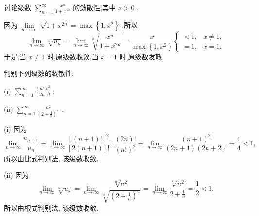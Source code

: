 \begin{example}

\end{example}
讨论级数 \(\mathop{\sum }\limits_{{n = 1}}^{\infty }\frac{{x}^{n}}{1 + {x}^{2n}}\) 的敛散性,其中 \(x > 0\) .

\begin{solution}

\end{solution}
因为 \(\mathop{\lim }\limits_{{n \rightarrow  \infty }}\sqrt[n]{1 + {x}^{2n}} = \max \left\{  {1,{x}^{2}}\right\}\) ,所以
\[
\mathop{\lim }\limits_{{n \rightarrow  \infty }}\sqrt[n]{{u}_{n}} = \mathop{\lim }\limits_{{n \rightarrow  \infty }}\sqrt[n]{\frac{{x}^{n}}{1 + {x}^{2n}}} = \frac{x}{\max \left\{  {1,{x}^{2}}\right\}  }\left\{  \begin{array}{ll}  < 1, & x \neq  1, \\   = 1, & x = 1. \end{array}\right.
\]
于是,当 \(x \neq  1\) 时,原级数收敛,当 \(x = 1\) 时,原级数发散.

\begin{example}

\end{example}
判别下列级数的敛散性:

 (i) \(\mathop{\sum }\limits_{{n = 1}}^{\infty }\frac{{\left( n!\right) }^{2}}{\left( {2n}\right) !}\) ;

(ii) \(\mathop{\sum }\limits_{{n = 1}}^{\infty }\frac{{n}^{2}}{{\left( 2 + \frac{1}{n}\right) }^{n}}\) .

\begin{solution}

\end{solution}
(i) 因为
\[
\mathop{\lim }\limits_{{n \rightarrow  \infty }}\frac{{u}_{n + 1}}{{u}_{n}} = \mathop{\lim }\limits_{{n \rightarrow  \infty }}\frac{{\left\lbrack  \left( n + 1\right) !\right\rbrack  }^{2}}{\left\lbrack  {2\left( {n + 1}\right) }\right\rbrack  !} \cdot  \frac{\left( {2n}\right) !}{{\left( n!\right) }^{2}} = \mathop{\lim }\limits_{{n \rightarrow  \infty }}\frac{{\left( n + 1\right) }^{2}}{\left( {{2n} + 1}\right) \left( {{2n} + 2}\right) } = \frac{1}{4} < 1,
\]
所以由比式判别法, 该级数收敛.

(ii) 因为
\[
\mathop{\lim }\limits_{{n \rightarrow  \infty }}\sqrt[n]{{u}_{n}} = \mathop{\lim }\limits_{{n \rightarrow  \infty }}\frac{\sqrt[n]{{n}^{2}}}{\sqrt[n]{{\left( 2 + \frac{1}{n}\right) }^{n}}} = \mathop{\lim }\limits_{{n \rightarrow  \infty }}\frac{\sqrt[n]{{n}^{2}}}{2 + \frac{1}{n}} = \frac{1}{2} < 1,
\]
所以由根式判别法, 该级数收敛.

